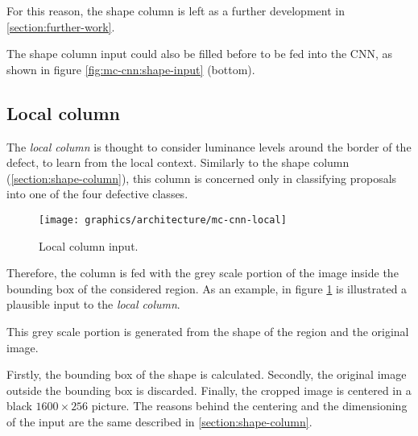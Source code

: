         \par{
            For this reason, the shape column is left as a further development in \ref{section:further-work}.
        }
        \par{
            The shape column input could also be filled before to be fed into the CNN, as shown in figure \ref{fig:mc-cnn:shape-input} (bottom).
        }
    \subsection{Local column}\label{section:local-column}
        \par{
            The \emph{local column} is thought to consider luminance levels around the border of the defect, to learn from the local context. Similarly to the shape column (\ref{section:shape-column}), this column is concerned only in classifying proposals into one of the four defective classes.
        }
        \begin{figure}
            \centering
            \texttt{[image: graphics/architecture/mc-cnn-local]}
            \caption{Local column input.}\label{fig:mc-cnn:local-input}
        \end{figure}
        \par{
            Therefore, the column is fed with the grey scale portion of the image inside the bounding box of the considered region. As an example, in figure \ref{fig:mc-cnn:local-input} is illustrated a plausible input to the \emph{local column}.
        }
        \par{
            This grey scale portion is generated from the shape of the region and the original image.
        }
        \par{
            Firstly, the bounding box of the shape is calculated. Secondly, the original image outside the bounding box is discarded. Finally, the cropped image is centered in a black $1600\times 256$ picture. The reasons behind the centering and the dimensioning of the input are the same described in \ref{section:shape-column}.
        }
